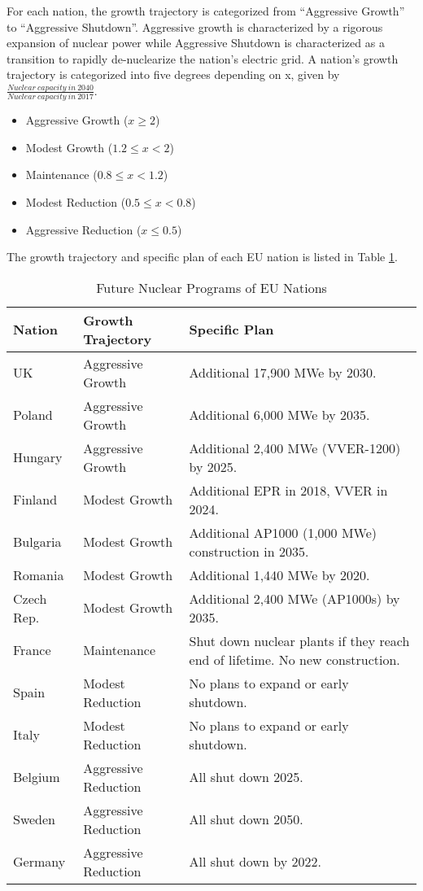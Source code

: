 For each nation, the growth trajectory is categorized from
``Aggressive Growth'' to ``Aggressive Shutdown''. Aggressive growth is
characterized by a rigorous expansion of nuclear power while 
Aggressive Shutdown is characterized as a transition to rapidly
de-nuclearize the nation's electric grid. A nation's growth trajectory is
categorized into five degrees depending on x, 
given by $\frac{Nuclear\ capacity\ in\ 2040}{Nuclear\ capacity\ in\ 2017}$.

\begin{itemize}
	\item Aggressive Growth ($x \geq 2$)
	\item Modest Growth ($1.2 \leq x < 2$)
	\item Maintenance ($0.8 \leq x < 1.2$)
	\item Modest Reduction ($0.5 \leq x< 0.8$)
	\item Aggressive Reduction ($x \leq 0.5$)
\end{itemize}

The growth trajectory and specific plan of each \gls{EU} nation 
is listed in Table \ref{tab:eu_growth}.

\begin{table}[h]
	\centering
		\begin{tabularx}{\textwidth}{llX}
			\hline 
                        \textbf{Nation} & \textbf{Growth Trajectory} & \textbf{Specific Plan} \\
			\hline
			UK & Aggressive Growth & Additional 17,900 MWe by 2030.\\
			Poland & Aggressive Growth & Additional 6,000 MWe by 2035.\\
			Hungary & Aggressive Growth & Additional 2,400 MWe (VVER-1200) by 2025. \\ 
			Finland & Modest Growth & Additional EPR in 2018, VVER in 2024.\\
			Bulgaria & Modest Growth & Additional AP1000 (1,000 MWe) construction in 2035. \\
			Romania & Modest Growth & Additional 1,440 MWe by 2020. \\
			Czech Rep. & Modest Growth & Additional 2,400 MWe (AP1000s) by 2035.\\
			France & Maintenance & Shut down nuclear plants if they reach end of lifetime. No new construction.\\
			Spain & Modest Reduction & No plans to expand or early shutdown. \\
			Italy & Modest Reduction & No plans to expand or early shutdown. \\
			Belgium & Aggressive Reduction & All shut down 2025.\\
			Sweden & Aggressive Reduction & All shut down 2050.\\
			Germany & Aggressive Reduction & All shut down by 2022.\\
			\hline
			
		\end{tabularx}

	\caption {Future Nuclear Programs of \gls{EU} Nations \cite{world_nuclear_association_nuclear_2017}}
  \label{tab:eu_growth}
\end{table}
\FloatBarrier
